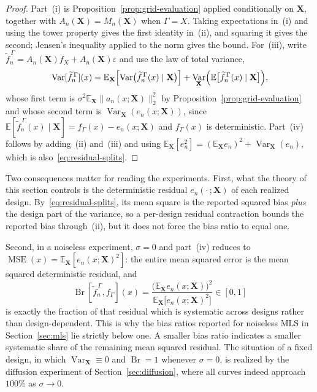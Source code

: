 \documentclass[12pt]{article}
\newcommand{\E}{{\mathbb{E}}}
\DeclareMathOperator{\br}{Br}
\DeclareMathOperator{\mse}{MSE}
\DeclareMathOperator{\var}{Var}
\begin{document}
\begin{proof}
Part~(i) is Proposition~\ref{prop:grid-evaluation} applied conditionally on $\mathbf X$, together with $A_n(\mathbf X)=M_n(\mathbf X)$ when $\Gamma=X$. Taking expectations in~(i) and using the tower property gives the first identity in~(ii), and squaring it gives the second; Jensen's inequality applied to the norm gives the bound. For~(iii), write $\widetilde f_n^{\,\Gamma}=A_n(\mathbf X)f_X+A_n(\mathbf X)\varepsilon$ and use the law of total variance,
\[
    \var[\widetilde f_n^{\,\Gamma}](x)
    =
    \E_{\mathbf X}\Bigl[\var\bigl(\widetilde f_n^{\,\Gamma}(x)\mid\mathbf X\bigr)\Bigr]
    +
    \var_{\mathbf X}\Bigl(\E\bigl[\widetilde f_n^{\,\Gamma}(x)\mid\mathbf X\bigr]\Bigr),
\]
whose first term is $\sigma^2\E_{\mathbf X}\|a_n(x;\mathbf X)\|_2^2$ by Proposition~\ref{prop:grid-evaluation} and whose second term is $\var_{\mathbf X}(e_n(x;\mathbf X))$, since $\E[\widetilde f_n^{\,\Gamma}(x)\mid\mathbf X]=f_\Gamma(x)-e_n(x;\mathbf X)$ and $f_\Gamma(x)$ is deterministic. Part~(iv) follows by adding~(ii) and~(iii) and using $\E_{\mathbf X}[e_n^2]=(\E_{\mathbf X}e_n)^2+\var_{\mathbf X}(e_n)$, which is also~\eqref{eq:residual-splits}.
\end{proof}

Two consequences matter for reading the experiments. First, what the theory of this section controls is the deterministic residual $e_n(\cdot\,;\mathbf X)$ of each realized design. By~\eqref{eq:residual-splits}, its mean square is the reported squared bias \emph{plus} the design part of the variance, so a per-design residual contraction bounds the reported bias through~(ii), but it does not force the bias ratio to equal one.

Second, in a noiseless experiment, $\sigma=0$ and part~(iv) reduces to $\mse(x)=\E_{\mathbf X}[e_n(x;\mathbf X)^2]$: the entire mean squared error is the mean squared deterministic residual, and
\[
    \br[\widetilde f_n^{\,\Gamma},f_\Gamma](x)
    =
    \frac{\bigl(\E_{\mathbf X}e_n(x;\mathbf X)\bigr)^2}{\E_{\mathbf X}\bigl[e_n(x;\mathbf X)^2\bigr]}
    \in[0,1]
\]
is exactly the fraction of that residual which is systematic across designs rather than design-dependent. This is why the bias ratios reported for noiseless MLS in Section~\ref{sec:mls} lie strictly below one. A smaller bias ratio indicates a smaller systematic share
of the remaining mean squared residual. The situation of a fixed design, in which $\var_{\mathbf X}\equiv0$ and $\br=1$ whenever $\sigma=0$, is realized by the diffusion experiment of Section~\ref{sec:diffusion}, where all curves indeed approach $100\%$ as $\sigma\to0$.
\end{document}
